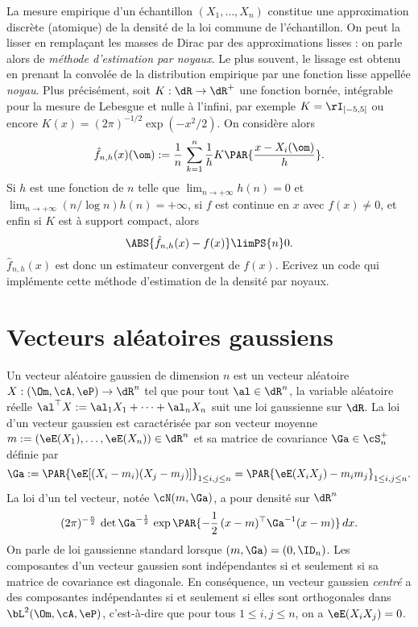 \begin{exo}
  La mesure empirique d'un échantillon $(X_1,\ldots,X_n)$ constitue une
  approximation discrète (atomique) de la densité de la loi commune de
  l'échantillon.  On peut la lisser en remplaçant les masses de Dirac par des
  approximations lisses : on parle alors de \emph{méthode d'estimation par
    noyaux}. Le plus souvent, le lissage est obtenu en prenant la convolée de
  la distribution empirique par une fonction lisse appellée \emph{noyau}.
  Plus précisément, soit $K:\dR \to \dR^+$ une fonction bornée, intégrable
  pour la mesure de Lebesgue et nulle à l'infini, par exemple $K=\rI_{[-5,5]}$
  ou encore $K(x)=(2\pi)^{-1/2} \exp(-x^2/2)$.  On considère alors
  $$
  \hat{f}_{n,h}(x)(\om)
  :=\frac{1}{n}\,\sum_{k=1}^n \frac{1}{h} K\PAR{\frac{x-X_i(\om)}{h}}.
  $$
  Si $h$ est une fonction de $n$ telle que $\lim_{n \to +\infty} h(n)=0$ et
  $\lim_{n \to +\infty} (n/\log n) h(n)=+\infty$, si $f$ est continue en $x$
  avec $f(x) \neq 0$, et enfin si $K$ est à support compact, alors
  $$
  \ABS{\hat{f}_{n,h}(x)-f(x)} \limPS{n} 0.
  $$
  $\hat f_{n,h}(x)$ est donc un estimateur convergent de $f(x)$. Ecrivez un
  code \ML{} qui implémente cette méthode d'estimation de la densité par
  noyaux.
\end{exo}

%
%
\chapter{Vecteurs aléatoires gaussiens}
%
%

Un vecteur aléatoire gaussien de dimension $n$ est un vecteur aléatoire
$X:(\Om,\cA,\eP)\to\dR^n$ tel que pour tout $\al\in\dR^n$, la variable
aléatoire réelle $\al^\top X:=\al_1 X_1+\cdots+\al_n X_n$ suit une loi
gaussienne sur $\dR$. La loi d'un vecteur gaussien est caractérisée par son
vecteur moyenne $m:=(\eE(X_1),\ldots,\eE(X_n))\in\dR^n$ et sa matrice de
covariance $\Ga\in\cS_n^+$ définie par
$$
\Ga:=\PAR{\eE[(X_i-m_i)(X_j-m_j)]}_{1\leq i,j \leq n}
    = \PAR{\eE(X_iX_j)-m_im_j}_{1\leq i,j \leq n}.
$$
La loi d'un tel vecteur, notée $\cN(m,\Ga)$, a pour densité sur $\dR^n$
$$
(2\pi)^{-\frac{n}{2}}\,\det \Ga^{-\frac{1}{2}}\,
\exp\PAR{-\frac{1}{2}\,(x-m)^\top \Ga^{-1} (x-m)}\,dx.
$$
On parle de loi gaussienne standard lorsque $(m,\Ga)=(0,\ID_n)$. Les
composantes d'un vecteur gaussien sont indépendantes si et seulement si sa
matrice de covariance est diagonale. En conséquence, un vecteur gaussien
\emph{centré} a des composantes indépendantes si et seulement si elles sont
orthogonales dans $\bL^2(\Om,\cA,\eP)$, c'est-à-dire que pour tous $1\leq i,j
\leq n$, on a $\eE(X_iX_j)=0$. 

